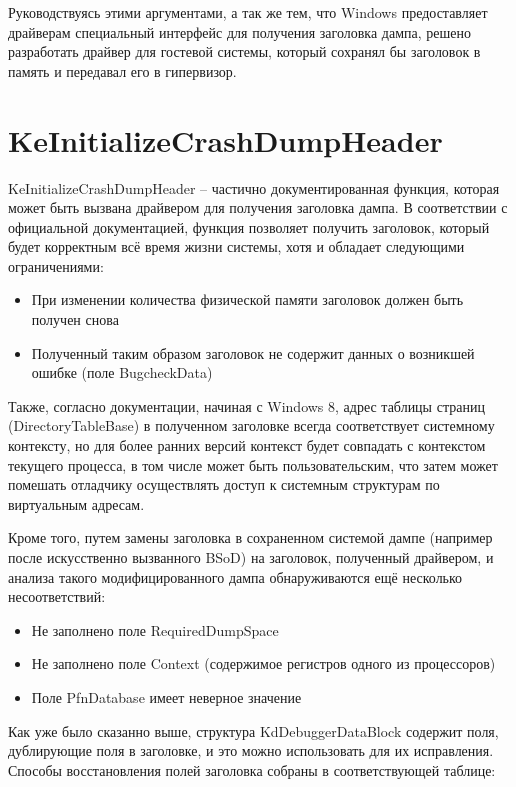 \documentclass{mipt-thesis-bs}
\begin{document}
Руководствуясь этими аргументами, а так же тем, что Windows предоставляет драйверам специальный интерфейс для получения заголовка дампа, решено разработать драйвер для гостевой системы, который сохранял бы заголовок в память и передавал его в гипервизор.

\section*{KeInitializeCrashDumpHeader}

KeInitializeCrashDumpHeader -- частично документированная функция, которая может быть вызвана драйвером для получения заголовка дампа.
В соответствии с официальной документацией, функция позволяет получить заголовок, который будет корректным всё время жизни системы, хотя и обладает следующими ограничениями:

\begin{itemize}
\item При изменении количества физической памяти заголовок должен быть получен снова
\item Полученный таким образом заголовок не содержит данных о возникшей ошибке (поле BugcheckData)
\end{itemize}

Также, согласно документации, начиная с Windows 8, адрес таблицы страниц (DirectoryTableBase) в полученном заголовке всегда соответствует системному контексту, но для более ранних версий контекст будет совпадать с контекстом текущего процесса, в том числе может быть пользовательским, что затем может помешать отладчику осуществлять доступ к системным структурам по виртуальным адресам.

Кроме того, путем замены заголовка в сохраненном системой дампе (например после искусственно вызванного BSoD) на заголовок, полученный драйвером, и анализа такого модифицированного дампа обнаруживаются ещё несколько несоответствий:

\begin{itemize}
\item Не заполнено поле RequiredDumpSpace
\item Не заполнено поле Context (содержимое регистров одного из процессоров)
\item Поле PfnDatabase имеет неверное значение
\end{itemize}

Как уже было сказанно выше, структура KdDebuggerDataBlock содержит поля, дублирующие поля в заголовке, и это можно использовать для их исправления.
Способы восстановления полей заголовка собраны в соответствующей таблице:
\end{document}
